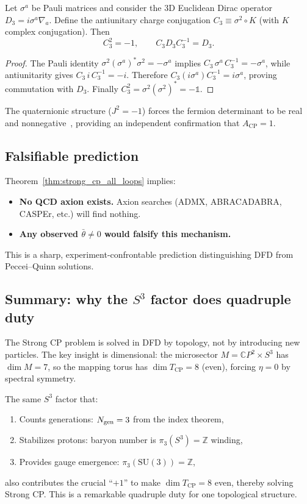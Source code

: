 \begin{lemma}\label{lem:S3_charge_conj}
Let $\sigma^a$ be Pauli matrices and consider the 3D Euclidean Dirac operator
$D_3 = i\sigma^a \nabla_a$.
Define the antiunitary charge conjugation $C_3\equiv \sigma^2\circ K$ (with $K$ complex conjugation).
Then
\begin{equation}
C_3^2=-1,\qquad C_3 D_3 C_3^{-1}=D_3 .
\end{equation}
\end{lemma}

\begin{proof}
The Pauli identity $\sigma^2(\sigma^a)^\ast\sigma^2=-\sigma^a$ implies
$C_3\,\sigma^a\,C_3^{-1}=-\sigma^a$, while antiunitarity gives $C_3\,i\,C_3^{-1}=-i$.
Therefore $C_3(i\sigma^a)C_3^{-1}=i\sigma^a$, proving commutation with $D_3$.
Finally $C_3^2=\sigma^2(\sigma^2)^\ast=-\mathbb{1}$.
\end{proof}

The quaternionic structure ($J^2=-1$) forces the fermion determinant to be real and nonnegative~\cite{FreedMoore2013,GarciaEtxebarriaMontero2018}, providing an independent confirmation that $A_{\mathrm{CP}}=1$.

\subsection{Falsifiable prediction}

Theorem~\ref{thm:strong_cp_all_loops} implies:
\begin{itemize}
\item \textbf{No QCD axion exists.} Axion searches (ADMX, ABRACADABRA, CASPEr, etc.) will find nothing.
\item \textbf{Any observed $\bar\theta \neq 0$ would falsify this mechanism.}
\end{itemize}
This is a sharp, experiment-confrontable prediction distinguishing DFD from Peccei--Quinn solutions.

\subsection{Summary: why the $S^3$ factor does quadruple duty}

The Strong CP problem is solved in DFD by topology, not by introducing new particles.
The key insight is dimensional: the microsector $M = \mathbb{C}P^2 \times S^3$ has $\dim M = 7$, so the mapping torus has $\dim T_{\mathrm{CP}} = 8$ (even), forcing $\eta = 0$ by spectral symmetry.

The same $S^3$ factor that:
\begin{enumerate}
\item Counts generations: $N_{\rm gen} = 3$ from the index theorem,
\item Stabilizes protons: baryon number is $\pi_3(S^3) = \mathbb{Z}$ winding,
\item Provides gauge emergence: $\pi_3(\mathrm{SU}(3)) = \mathbb{Z}$,
\end{enumerate}
also contributes the crucial ``$+1$'' to make $\dim T_{\mathrm{CP}} = 8$ even, thereby solving Strong CP.
This is a remarkable quadruple duty for one topological structure.
